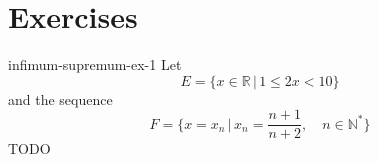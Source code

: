 \documentclass[preview]{standalone}
\begin{document}
\genpage

\section{Exercises}


\begin{snippetexercise}{infimum-supremum-ex-1}{}
    Let
    \[
        E = \{ x\in\mathbb{R} \,|\, 1 \leq 2x < 10 \}
    \]
    and the sequence \[
        F = \{ x = x_n \,|\, x_n = \frac{n + 1}{n + 2}, \quad n\in\mathbb{N}^* \}
    \]
    TODO
\end{snippetexercise}
\end{document}
